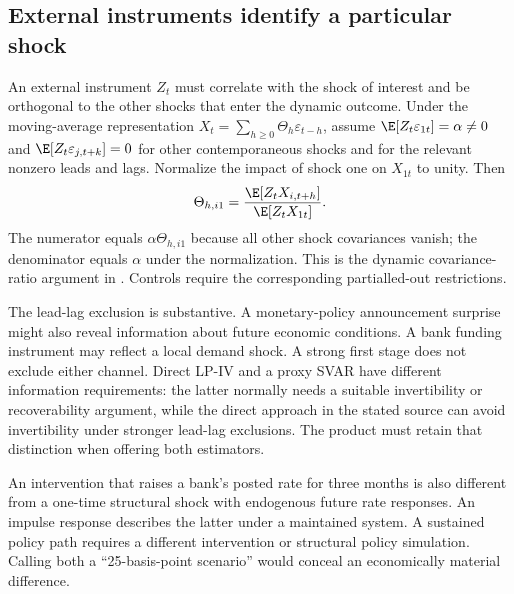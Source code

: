 \subsection{External instruments identify a particular shock}
An external instrument $Z_t$ must correlate with the shock of interest and
be orthogonal to the other shocks that enter the dynamic outcome.
Under the moving-average representation
$X_t=\sum_{h\geq0}\Theta_h\varepsilon_{t-h}$, assume
$\E[Z_t\varepsilon_{1t}]=\alpha\ne0$ and
$\E[Z_t\varepsilon_{j,t+k}]=0$ for other contemporaneous shocks
and for the relevant nonzero leads and lags. Normalize the impact of shock
one on $X_{1t}$ to unity. Then
\begin{equation}
 \Theta_{h,i1}=\frac{\E[Z_t X_{i,t+h}]}{\E[Z_t X_{1t}]}.
 \label{eq:lpiv}
\end{equation}
The numerator equals $\alpha\Theta_{h,i1}$ because all other shock
covariances vanish; the denominator equals $\alpha$ under the normalization.
This is the dynamic covariance-ratio argument in
\citet[Section 2.3]{stock2018}. Controls require the corresponding
partialled-out restrictions.

The lead-lag exclusion is substantive. A monetary-policy announcement
surprise might also reveal information about future economic conditions.
A bank funding instrument may reflect a local demand shock. A strong first
stage does not exclude either channel. Direct LP-IV and a proxy SVAR have
different information requirements: the latter normally needs a suitable
invertibility or recoverability argument, while the direct approach in the
stated source can avoid invertibility under stronger lead-lag exclusions.
The product must retain that distinction when offering both estimators.

An intervention that raises a bank's posted rate for three months is also
different from a one-time structural shock with endogenous future rate
responses. An impulse response describes the latter under a maintained
system. A sustained policy path requires a different intervention or
structural policy simulation. Calling both a ``25-basis-point scenario''
would conceal an economically material difference.

